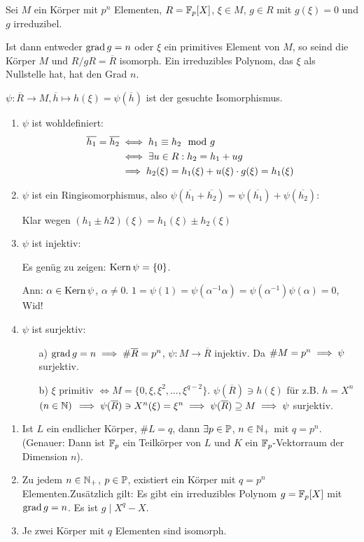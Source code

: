 \documentclass[a4paper,DIV15,BCOR12mm]{article}
\begin{document}
\begin{hilfssatz}[5]
Sei $M$ ein Körper mit $p^n$ Elementen, $R=\mathbb{F}_p[X]$, $\xi\in M$, $g\in R$ mit $g(\xi)=0$ und $g$ irreduzibel.

Ist dann entweder $\mathop{\rm grad}\nolimits g= n$ oder $\xi$ ein primitives Element von $M$, so seind die Körper $M$ und $R/gR = \overline R$ isomorph. Ein irreduzibles Polynom, das $\xi$ als Nullstelle hat, hat den Grad $n$.
\end{hilfssatz}
\begin{beweis}
$\psi:\overline R \to M, \overline h \mapsto h(\xi)=\psi(\overline h)$ ist der gesuchte Isomorphismus.
\begin{enumerate}
\item $\psi$ ist wohldefiniert:
\begin{align*}
\overline{h_1} = \overline{h_2} &\iff h_1 \equiv h_2 \mod g \\
&\iff \exists u\in R: h_2 = h_1 + ug\\
&\implies h_2(\xi) = h_1(\xi) + u(\xi)\cdot g(\xi) = h_1(\xi)
\end{align*}
\item $\psi$ ist ein Ringisomorphismus, also $\psi(\overline {h_1} + \overline{h_2}) = \psi(\overline{h_1}) + \psi(\overline{h_2})$:

Klar wegen $(h_1 \pm h2)(\xi) = h_1(\xi) \pm h_2(\xi)$
\item $\psi$ ist injektiv:

Es genüg zu zeigen: $\mathop{\rm Kern}\nolimits \psi = \{0\}$.

Ann: $\alpha \in \mathop{\rm Kern}\nolimits \psi$, $\alpha \ne 0$. $1 = \psi(1) = \psi(\alpha^{-1} \alpha) = \psi(\alpha^{-1})\psi(\alpha) = 0$, Wid!
\item $\psi$ ist surjektiv:
\begin{enumerate}
\item[a)] $\mathop{\rm grad}\nolimits g = n \implies \#\overline R = p^n$, $\psi:M\to\overline R$ injektiv. Da $\#M = p^n \implies \psi$ surjektiv.
\item[b)] $\xi$ primitiv $\iff M=\{0,\xi,\xi^2,\ldots,\xi^{q-2}\}$. $\psi(\overline R) \ni h(\xi)$ für z.B. $h=X^n$ $(n\in\mathbb{N})$ $\implies \psi(\overline R) \ni X^n(\xi) = \xi ^n \implies \psi(\overline R) \supseteq M \implies \psi$ surjektiv.
\end{enumerate}
\end{enumerate}
\end{beweis}

\begin{satz}
\begin{enumerate}
\item Ist $L$ ein endlicher Körper, $\#L=q$, dann $\exists p \in \mathbb{P}$, $n\in\mathbb{N}_+$ mit $q=p^n$. (Genauer: Dann ist $\mathbb{F}_p$ ein Teilkörper von $L$ und $K$ ein $\mathbb{F}_p$-Vektorraum der Dimension $n$).
\item Zu jedem $n\in\mathbb{N}_+$, $p\in\mathbb{P}$, existiert ein Körper mit $q=p^n$ Elementen.Zusätzlich gilt: Es gibt ein irreduzibles Polynom $g=\mathbb{F}_p[X]$ mit $\mathop{\rm grad}\nolimits g=n$. Es ist $g \mid X^q -X$.
\item Je zwei Körper mit $q$ Elementen sind isomorph.
\end{enumerate}
\end{satz}
\end{document}

